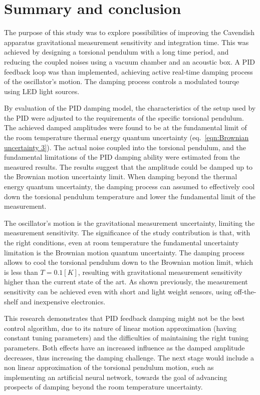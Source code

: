\documentclass[\main/master.tex]{subfiles}
\begin{document}
\newspacing
\chapter{Summary and conclusion}\label{chapter:Summary and conclusion}
The purpose of this study was to explore possibilities of improving the Cavendish apparatus gravitational measurement sensitivity and integration time. This was achieved by designing a torsional pendulum with a long time period, and reducing the coupled noises using a vacuum chamber and an acoustic box. A PID feedback loop was than implemented, achieving active real-time damping process of the oscillator's motion. The damping process controls a modulated tourqe using LED light sources. 
\par\noindent
By evaluation of the PID damping model, the characteristics of the setup used by the PID were adjusted to the requirements of the specific torsional pendulum. The achieved damped amplitudes were found to be at the fundamental limit of the room temperature thermal energy quantum uncertainty (eq.~\ref{eqn:Brownian uncertainty 3}). The actual noise coupled into the torsional pendulum, and the fundamental limitations of the PID damping ability were estimated from the measured results. The results suggest that the amplitude could be damped up to the Brownian motion uncertainty limit. When damping beyond the thermal energy quantum uncertainty, the damping process can assumed to effectively cool down the torsional pendulum temperature and lower the fundamental limit of the measurement. 
\par\noindent
The oscillator's motion is the gravitational measurement uncertainty, limiting the measurement sensitivity. The significance of the study contribution is that, with the right conditions, even at room temperature the fundamental uncertainty limitation is the Brownian motion quantum uncertainty. The damping process allows to cool the torsional pendulum down to the Brownian motion limit, which is less than $T=0.1[K]$, resulting with gravitational measurement sensitivity higher than the current state of the art. As shown previously, the  measurement sensitivity can be achieved even with short and light weight sensors, using off-the-shelf and inexpensive electronics.
\par\noindent
This research demonstrates that PID feedback damping might not be the best control algorithm, due to its nature of linear motion approximation (having constant tuning parameters) and the difficulties of maintaining the right tuning parameters. Both effects have an increased influence as the damped amplitude decreases, thus increasing the damping challenge. The next stage would include a non linear approximation of the torsional pendulum motion, such as implementing an artificial neural network, towards the goal of advancing prospects of damping beyond the room temperature uncertainty. 
\end{document}

